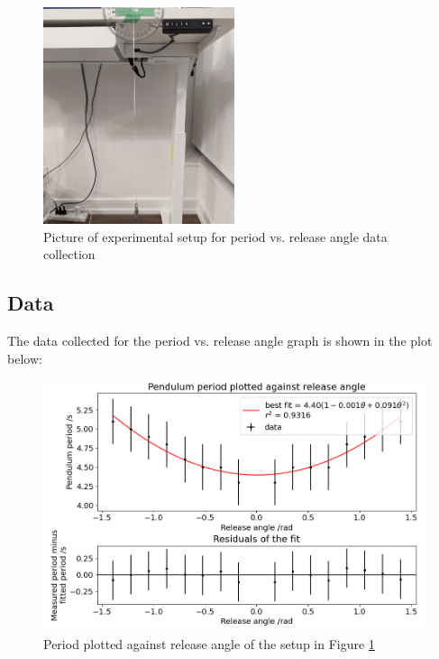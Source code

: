 \documentclass[12pt]{article}
\begin{document}
\begin{figure}[!hptb]
    \centering
    \includegraphics[width=0.5\textwidth]{../figures/exp_setup1.jpg}
    \caption{\centering Picture of experimental setup for period vs. release angle data collection}
    \label{fig:figure 1}
\end{figure}

\newpage

\subsection{Data} \label{subsec 3.2 Data}
The data collected for the period vs. release angle graph is shown in the plot below:

\begin{figure}[!hptb]
    \centering
    \includegraphics[width=\textwidth]{../figures/period_vs_release_angle.png}
    \caption{\centering Period plotted against release angle of the setup in Figure \ref{fig:figure 1}}
    \label{fig:figure 2}
\end{figure}
\end{document}
